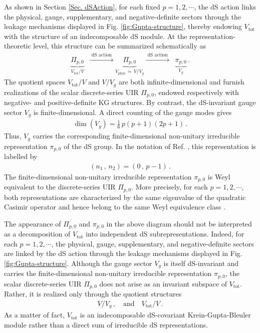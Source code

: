 \documentclass[aps,twocolumn,nofootinbib]{revtex4}
\begin{document}
As shown in Section \ref{Sec. dSAction}, for each fixed $p=1,2,\cdots$, the dS action links the physical, gauge, supplementary, and negative-definite sectors through the leakage mechanisms displayed in Fig. \ref{fig:Gupta-structure}, thereby endowing $V_{\text{tot}}$ with the structure of an indecomposable dS module. At the representation-theoretic level, this structure can be summarized schematically as
\begin{align}
    \underbrace{\Pi_{p,0}}_{V_{\text{tot}}/V}
    \;\;\xrightarrow[]{\text{ dS action }}
    \underbrace{\Pi_{p,0}}_{V_{\mathrm{phys}}\,\simeq\, V/V_g}
    \xrightarrow[]{\text{ dS action }}\;\;
    \underbrace{\pi_{p,0}}_{V_g}\,.
\end{align}
The quotient spaces $V_{\mathrm{tot}}/V$ and $V/V_g$ are both infinite-dimensional and furnish realizations of the scalar discrete-series UIR $\Pi_{p,0}$, endowed respectively with negative- and positive-definite KG structures. By contrast, the dS-invariant gauge sector $V_g$ is finite-dimensional. A direct counting of the gauge modes gives
\begin{align}\label{dim}
    \dim(V_g) = \frac{1}{6}\,p(p+1)(2p+1)\,.
\end{align}
Thus, $V_g$ carries the corresponding finite-dimensional non-unitary irreducible representation $\pi_{p,0}$ of the dS group. In the notation of Ref. \cite{Gazeau2022}, this representation is labelled by
\begin{align}\label{IR}
    (n_1 \,,\, n_2) = (0 \,,\, p-1)\,.
\end{align}
The finite-dimensional non-unitary irreducible representation $\pi_{p,0}$ is Weyl equivalent to the discrete-series UIR $\Pi_{p,0}$. More precisely, for each $p=1,2,\cdots$, both representations are characterized by the same eigenvalue of the quadratic Casimir operator and hence belong to the same Weyl equivalence class \cite{Gazeau2022}.

The appearance of $\Pi_{p,0}$ and $\pi_{p,0}$ in the above diagram should not be interpreted as a decomposition of $V_{\mathrm{tot}}$ into independent dS subrepresentations. Indeed, for each $p=1,2,\cdots$, the physical, gauge, supplementary, and negative-definite sectors are linked by the dS action through the leakage mechanisms displayed in Fig. \ref{fig:Gupta-structure}. Although the gauge sector $V_g$ is itself dS-invariant and carries the finite-dimensional non-unitary irreducible representation $\pi_{p,0}$, the scalar discrete-series UIR $\Pi_{p,0}$ does not arise as an invariant subspace of $V_{\mathrm{tot}}$. Rather, it is realized only through the quotient structures
\begin{align}
    V/V_g \,, \quad\mbox{and}\quad V_{\mathrm{tot}}/V \,.
\end{align}
As a matter of fact, $V_{\mathrm{tot}}$ is an indecomposable dS-covariant Krein-Gupta-Bleuler module rather than a direct sum of irreducible dS representations.
\end{document}

